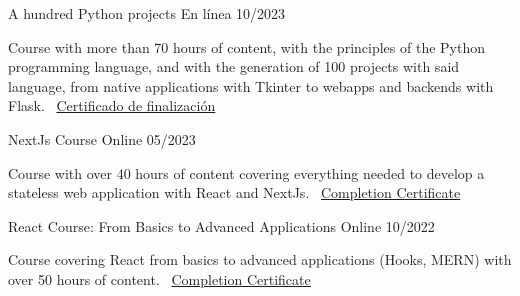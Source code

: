 \documentclass[]{awesome-cv}
\begin{document}
\vspace{4mm}
\begin{cventries}
	\vspace{2mm}

    \cventry
	{}
	{A hundred Python projects \vspace{-4mm}}
	{En línea \vspace{-5mm}}
	{10/2023 \vspace{-5mm}}
	{\begin{cvsectionnormaltext} 
		\item{Course with more than 70 hours of content, with the principles of the Python programming language, and with the generation of 100 projects with said language, from native applications with Tkinter to webapps and backends with Flask.
		\newline \vspace{2mm} \faLink\ \href{https://www.udemy.com/certificate/UC-2d01021e-af92-434c-a4a3-7fc7b33976c9/}{Certificado de finalización}}
	\end{cvsectionnormaltext}}
    {}
 
	\cventry
	{}
	{NextJs Course \vspace{-4mm}}
	{Online \vspace{-5mm}}
	{05/2023 \vspace{-5mm}}
	{\begin{cvsectionnormaltext} 
		\item{Course with over 40 hours of content covering everything needed to develop a stateless web application with React and NextJs.
		\newline \vspace{2mm} \faLink\ \href{https://www.udemy.com/certificate/UC-1ede8757-aa0d-406f-813a-8eaa400532c5/}{Completion Certificate}}
	\end{cvsectionnormaltext}}
    {}

	\cventry
	{}
	{React Course: From Basics to Advanced Applications \vspace{-4mm}}
	{Online \vspace{-5mm}}
	{10/2022 \vspace{-5mm}}
	{\begin{cvsectionnormaltext} 
		\item{Course covering React from basics to advanced applications (Hooks, MERN) with over 50 hours of content.
		\newline \vspace{2mm} \faLink\ \href{https://www.udemy.com/certificate/UC-fcb467ab-c089-419c-9b6a-afe97f894d14/}{Completion Certificate}}
	\end{cvsectionnormaltext}}
    {}


\end{cventries}
\end{document}
